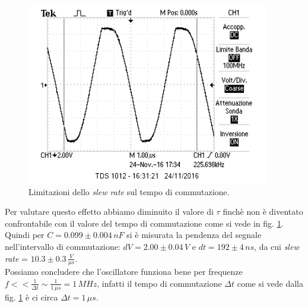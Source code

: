 \documentclass[10pt,a4paper]{article}
\begin{document}
\begin{figure}[htb!]
\centering
\includegraphics[scale=1.0]{immagini/multivibSlewRate.png}
\caption{Limitazioni dello \emph{slew rate} sul tempo di commutazione.}
\label{slewrate}
\end{figure}

Per valutare questo effetto abbiamo diminuito il valore di $\tau$ finchè non è diventato confrontabile con il valore del tempo di commutazione come si vede in fig. \ref{slewrate}. Quindi per $C = 0.099 \pm 0.004\, nF$ si è misurata la pendenza del segnale nell'intervallo di commutazione: $dV = 2.00 \pm 0.04 \, V$ e $dt = 192 \pm 4 \, ns$, da cui \emph{slew rate} = $10.3 \pm 0.3 \, \frac{V}{\mu s}$.\\
Possiamo concludere che l'oscillatore funziona bene per frequenze $f << \frac{1}{\Delta t} \sim \frac{1}{1 \, \mu s} = 1 \, MHz$, infatti il tempo di commutazione $\Delta t$ come si vede dalla fig. \ref{slewrate} è ci circa $\Delta t = 1 \, \mu s$.
\end{document}
